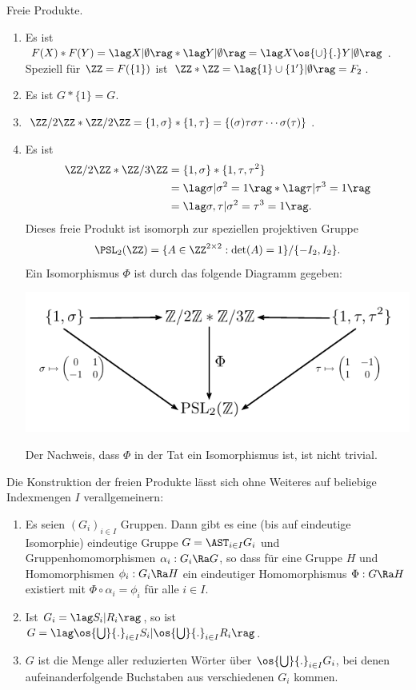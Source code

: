 \BSP Freie Produkte.
\begin{enumerate}
\item Es ist $F(X)*F(Y) = \lag X|\emptyset\rag*\lag Y|\emptyset\rag
=\lag X\os{\cup}{.} Y|\emptyset\rag$.
Speziell für $\ZZ=F(\{1\})$ ist
$\ZZ*\ZZ=\lag \{1\}\cup\{1'\}|\emptyset\rag=F_2$.
\item Es ist $G*\{1\}=G$.
\item $\ZZ/2\ZZ*\ZZ/2\ZZ=\{1,\sigma\}*\{1,\tau\}
=\{(\sigma)\tau\sigma\tau\cdots\sigma(\tau)\}$.
\item Es ist
\begin{align*}
\ZZ/2\ZZ * \ZZ/3\ZZ &= \{1,\sigma\}*\{1,\tau,\tau^2\} \\
&=\lag\sigma|\sigma^2=1\rag*\lag\tau|\tau^3=1\rag\\
&=\lag\sigma,\tau|\sigma^2=\tau^3=1\rag.
\end{align*}
Dieses freie Produkt ist isomorph zur speziellen projektiven Gruppe
\[
\PSL_2(\ZZ)
=\{
A\in \ZZ^{2\times 2} : \det(A)=1
\}/\{-I_2, I_2\}.
\]
Ein Isomorphismus $\Phi$ ist durch das folgende Diagramm gegeben:
\begin{center}
	\includegraphics{grugraImages/PSL}
\end{center}
Der Nachweis, dass $\Phi$ in der Tat ein Isomorphismus ist, ist nicht
trivial.
\end{enumerate}

\BEM Die Konstruktion der freien Produkte lässt sich
ohne Weiteres auf beliebige Indexmengen $I$ verallgemeinern:
\begin{enumerate}
\item Es seien $(G_i)_{i\in I}$ Gruppen. Dann gibt es eine (bis auf eindeutige
Isomorphie) eindeutige Gruppe $G=\AST_{i\in I} G_i$ und
Gruppenhomomorphismen $\alpha_i:G_i\Ra G$, so dass
für eine Gruppe $H$ und Homomorphismen $\phi_i:G_i\Ra H$
ein eindeutiger Homomorphismus $\Phi:G\Ra H$ existiert mit
$\Phi\circ\alpha_i=\phi_i$ für alle $i\in I$.
\item Ist $G_i=\lag S_i|R_i\rag$, so ist
$G=\lag \os{\bigcup}{.}_{i\in I}S_i|\os{\bigcup}{.}_{i\in I}R_i \rag$.
\item $G$ ist die Menge aller reduzierten Wörter über
$\os{\bigcup}{.}_{i\in I} G_i$, bei denen aufeinanderfolgende
Buchstaben aus verschiedenen $G_i$ kommen.
\end{enumerate}

